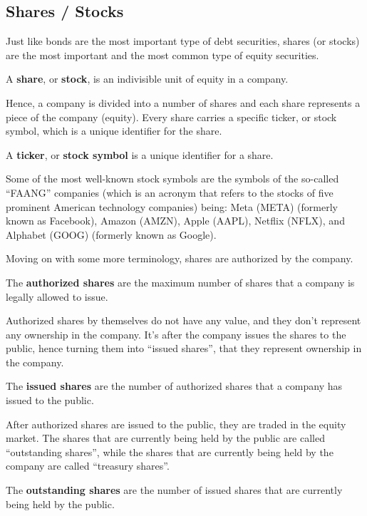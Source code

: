 \subsection{Shares / Stocks}

Just like bonds are the most important type of debt securities, shares (or stocks) are the most important and the most
common type of equity securities.

A \textbf{share}, or \textbf{stock}, is an indivisible unit of equity in a company.
\ed

Hence, a company is divided into a number of shares and each share represents a piece of the company (equity). Every
share carries a specific ticker, or stock symbol, which is a unique identifier for the share.

A \textbf{ticker}, or \textbf{stock symbol} is a unique identifier for a share.
\ed

\be
Some of the most well-known stock symbols are the symbols of the so-called ``FAANG'' companies (which is an acronym
that refers to the stocks of five prominent American technology companies) being: Meta (META) (formerly known as
Facebook), Amazon (AMZN), Apple (AAPL), Netflix (NFLX), and Alphabet (GOOG) (formerly known as Google).
\ee

Moving on with some more terminology, shares are authorized by the company.

The \textbf{authorized shares} are the maximum number of shares that a company is legally allowed to issue.
\ed

Authorized shares by themselves do not have any value, and they don't represent any ownership in the company. It's
after the company issues the shares to the public, hence turning them into ``issued shares'', that they represent
ownership in the company.

The \textbf{issued shares} are the number of authorized shares that a company has issued to the public.
\ed

After authorized shares are issued to the public, they are traded in the equity market. The shares that are currently
being held by the public are called ``outstanding shares'', while the shares that are currently being held by the
company are called ``treasury shares''.

The \textbf{outstanding shares} are the number of issued shares that are currently being held by the public.
\ed

